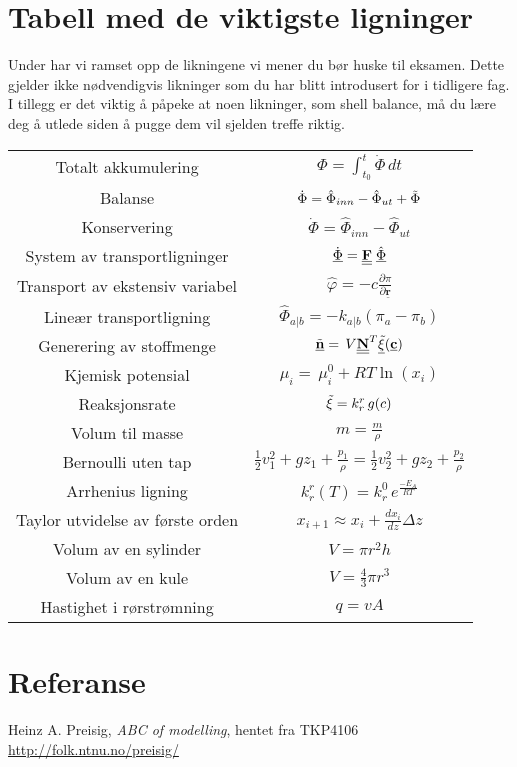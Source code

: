\clearpage
\section{Tabell med de viktigste ligninger}
Under har vi ramset opp de likningene vi mener du bør huske til eksamen. Dette gjelder ikke nødvendigvis likninger som du har blitt introdusert for i tidligere fag. I tillegg er det viktig å påpeke at noen likninger, som shell balance, må du lære deg å utlede siden å pugge dem vil sjelden treffe riktig. 
\begin{table}[H]
    \centering
    \begin{tabular}{c|c}
        Totalt akkumulering & $\Phi = \int_{t_0}^{t}\dot{\Phi}\,dt $  \\[0.2cm]
         Balanse  & $\dot{\Phi} = \hat{\Phi}_{inn} - \hat{\Phi}_{ut} + \Tilde{\Phi}$ \\[0.2cm]
         Konservering & $\dot{\Phi} = \hat{\Phi}_{inn} - \hat{\Phi}_{ut} $\\[0.2cm]
         System av transportligninger & $\underline{\dot{\Phi}} = \textbf{\underline{\underline{F}}}\hspace{0.1cm}\underline{\hat{\Phi}}$ \\[0.2cm]
         Transport av ekstensiv variabel & $\hat{\varphi} = -c\frac{\partial \pi}{\partial \underline{\textbf{r}}}$ \\[0.2cm]
         Lineær transportligning & $\hat{\Phi}_{a|b} = -k_{a|b}(\pi_a-\pi_b)$ \\[0.2cm] 
         Generering av stoffmenge & $\underline{\Tilde{\textbf{n}}}=\,V\underline{\underline{\textbf{N}}}^T\underline{\Tilde{\xi}}(\underline{\textbf{c}})$ \\[0.2cm]
         Kjemisk potensial & $\mu_i =\, \mu_{i}^0 + RT\ln (x_i)$ \\[0.2cm]
         Reaksjonsrate & $\Tilde{\xi} = k^r_r\,g(c)$ \\[0.2cm]
         Volum til masse & $m = \frac{m}{\rho}$\\[0.2cm]
         Bernoulli uten tap& 
    $\frac{1}{2}v_1^2 + gz_1 + \frac{p_1}{\rho} = \frac{1}{2}v_2^2 + gz_2 + \frac{p_2}{\rho}$ \\[0.2cm]
         Arrhenius ligning & $k^r_r(T) =k^0_r\,e^{\frac{-E_{A}}{RT}}$ \\[0.2cm]
         Taylor utvidelse av første orden & $x_{i+1} \approx x_i + \frac{dx_i}{dz}\Delta z$ \\[0.2cm]
         Volum av en sylinder & $V=\pi r^2h$\\[0.2cm]
         Volum av en kule & $V=\frac{4}{3}\pi r^3$\\[0.2cm]
         Hastighet i rørstrømning & $q = vA$\\[0.2cm]
         
    \end{tabular}
    \label{tab:my_label}
\end{table}

\appendix
\section{Referanse}
Heinz A. Preisig, \textit{ABC of modelling}, hentet fra TKP4106 \url{http://folk.ntnu.no/preisig/}